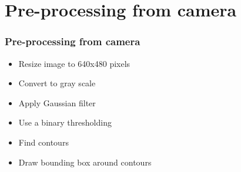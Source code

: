 \documentclass[11.5pt,aspectratio=1610,xcolor={usenames,dvipsnames,table}]{beamer}
\begin{document}
\section{Pre-processing from camera}
\begin{frame}
\frametitle{Pre-processing from camera}

\begin{itemize}
	\item Resize image to 640x480 pixels
	\item Convert to gray scale
	\item Apply Gaussian filter
	\item Use a binary thresholding
	\item Find contours
	\item Draw bounding box around contours
\end{itemize}
\end{frame}
\end{document}
